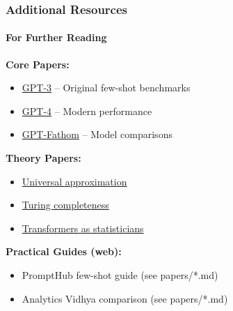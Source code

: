 \documentclass[10pt,aspectratio=169]{beamer}
\begin{document}
\begin{frame}
\frametitle{Additional Resources}
\framesubtitle{For Further Reading}

\textbf{Core Papers:}
\begin{itemize}
    \item \href{papers/2005.14165_gpt3_language_models_few_shot.pdf}{\color{blue}GPT-3} -- Original few-shot benchmarks
    \item \href{papers/2303.08774_gpt4_technical_report.pdf}{\color{blue}GPT-4} -- Modern performance
    \item \href{papers/2309.16583_gpt_fathom.pdf}{\color{blue}GPT-Fathom} -- Model comparisons
\end{itemize}

\vspace{0.5cm}
\textbf{Theory Papers:}
\begin{itemize}
    \item \href{papers/1912.10077_universal_approximators.pdf}{\color{blue}Universal approximation}
    \item \href{papers/1901.03429_turing_completeness.pdf}{\color{blue}Turing completeness}
    \item \href{papers/2306.04637_transformers_statisticians.pdf}{\color{blue}Transformers as statisticians}
\end{itemize}

\vspace{0.5cm}
\textbf{Practical Guides (web):}
\begin{itemize}
    \item PromptHub few-shot guide (see papers/*.md)
    \item Analytics Vidhya comparison (see papers/*.md)
\end{itemize}
\end{frame}
\end{document}
